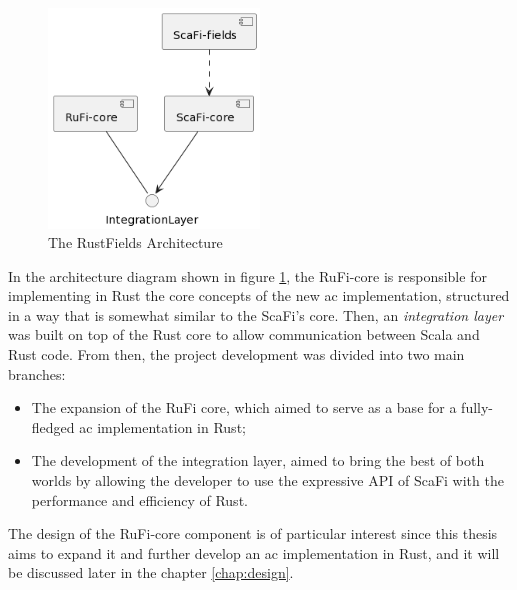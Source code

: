 \begin{figure}[h]
    \centering
    \includegraphics[width=0.5\textwidth]{figures/diagrams/img/rustfields-full-architecture.png}
    \caption{The RustFields Architecture}
    \label{fig:rustfields-architecture}
\end{figure}

In the architecture diagram shown in figure \ref{fig:rustfields-architecture}, the RuFi-core is responsible for implementing in Rust the core concepts of the new \ac{ac} implementation,
structured in a way that is somewhat similar to the ScaFi's core. Then, an \textit{integration layer} was built on top of the Rust core to allow communication
between Scala and Rust code. From then, the project development was divided into two main branches:
\begin{itemize}
    \item The expansion of the RuFi core, which aimed to serve as a base for a fully-fledged \ac{ac} implementation in Rust;
    \item The development of the integration layer, aimed to bring the best of both worlds by allowing the developer to use the expressive API of ScaFi with the performance and efficiency of Rust.
\end{itemize}

The design of the RuFi-core component is of particular interest since this thesis aims to expand it and further develop an \ac{ac} implementation in Rust, and it will be discussed
later in the chapter \ref{chap:design}.